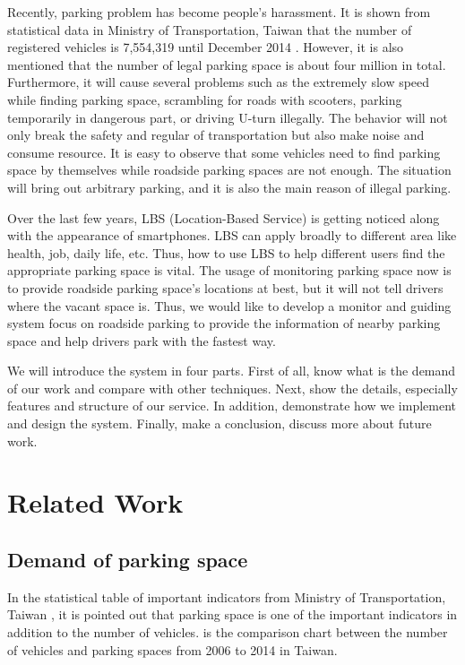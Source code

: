 \documentclass[preprint,12pt]{elsarticle}
\begin{document}
Recently, parking problem has become people's harassment.
It is shown from statistical data in Ministry of
Transportation, Taiwan that the number of registered vehicles is
7,554,319 until December 2014 \cite{motc}.
However, it is also mentioned that
the number of legal parking space is about four million in total.
Furthermore, it will cause several problems such as the extremely slow
speed while finding parking space, scrambling for roads with scooters,
parking temporarily in dangerous part, or driving U-turn illegally. The
behavior will not only break the safety and regular of transportation
but also make noise and consume resource.
It is easy to observe that some vehicles need to find parking space by
themselves while roadside parking spaces are not enough. The situation
will bring out arbitrary parking, and it is also the main reason of
illegal parking.

Over the last few years, LBS (Location-Based Service) \cite{LBS} is getting noticed along with
the appearance of smartphones. LBS can apply broadly to different area
like health, job, daily life, etc. Thus, how to use LBS to help
different users find the appropriate parking space is vital. The usage
of monitoring parking space now is to provide roadside parking space's
locations at best, but it will not tell drivers where the vacant space
is. Thus, we would like to develop a monitor and guiding system focus on
roadside parking to provide the information of nearby parking space and
help drivers park with the fastest way.

We will introduce the system in four parts. First of all, know what is
the demand of our work and compare with other techniques. Next, show the
details, especially features and structure of our service. In addition,
demonstrate how we implement and design the system. Finally, make a
conclusion, discuss more about future work.


\section{Related Work}\label{sec:relatedWork}

%
\subsection{Demand of parking space}
%

In the statistical table of important indicators from Ministry of
Transportation, Taiwan \cite{motc}, it is pointed out that parking space is one
of the important indicators in addition to the number of vehicles.
 is the comparison chart between the number of vehicles and
parking spaces from 2006 to 2014 in Taiwan.
\end{document}
